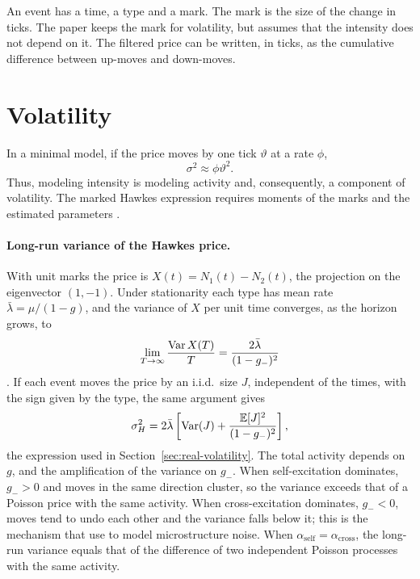 An event has a time, a type and a mark. The mark is the size of the change in ticks.
The paper keeps the mark for volatility, but assumes that the intensity does not
depend on it. The filtered price can be written, in ticks, as the cumulative
difference between up-moves and down-moves.

\section{Volatility}
\label{sec:volatility-theory}

In a minimal model, if the price moves by one tick \(\vartheta\) at a rate \(\phi\),
\[
 \sigma^2\approx\phi\vartheta^2.
\]
Thus, modeling intensity is modeling activity and, consequently, a component of
volatility. The marked Hawkes expression requires moments of the marks and the
estimated parameters \citep{leeseo2017,lee2024}.

\paragraph{Long-run variance of the Hawkes price.} With unit marks the price is
\(X(t)=N_1(t)-N_2(t)\), the projection on the eigenvector \((1,-1)\). Under stationarity each
type has mean rate \(\bar\lambda=\mu/(1-g)\), and the variance of \(X\) per unit time
converges, as the horizon grows, to
\[
 \lim_{T\to\infty}\frac{\operatorname{Var} X(T)}{T}=\frac{2\bar\lambda}{(1-g_-)^2}
\]
\citep{bacry2013}. If each event moves the price by an i.i.d.\ size \(J\), independent of the
times, with the sign given by the type, the same argument gives
\begin{equation}
 \sigma_H^2=2\bar\lambda\left[\operatorname{Var}(J)+\frac{\mathbb{E}[J]^2}{(1-g_-)^2}\right],
 \label{eq:hawkes-variance}
\end{equation}
the expression used in Section~\ref{sec:real-volatility}. The total activity depends on
\(g\), and the amplification of the variance on \(g_-\). When self-excitation dominates,
\(g_->0\) and moves in the same direction cluster, so the variance exceeds that of a Poisson
price with the same activity. When cross-excitation dominates, \(g_-<0\), moves tend to undo
each other and the variance falls below it; this is the mechanism that \citet{bacry2013} use
to model microstructure noise. When \(\alpha_{\mathrm{self}}=\alpha_{\mathrm{cross}}\), the
long-run variance equals that of the difference of two independent Poisson processes with the
same activity.


